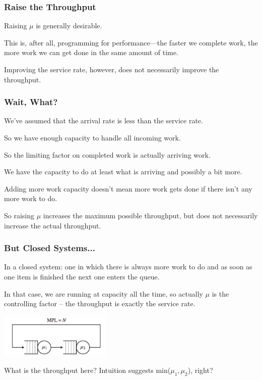 \begin{frame}
\frametitle{Raise the Throughput}

Raising $\mu$ is generally desirable. 

This is, after all, programming for performance---the faster we complete work, the more work we can get done in the same amount of time. 

Improving the service rate, however, does not necessarily improve the throughput. 

\end{frame}



\begin{frame}
\frametitle{Wait, What?}

We've assumed that the arrival rate is less than the service rate. 

So we have enough capacity to handle all incoming work. 

So the limiting factor on completed work is actually arriving work. 

We have the capacity to do at least what is arriving and possibly a bit more. 

Adding more work capacity doesn't mean more work gets done if there isn't any more work to do.

So raising $\mu$ increases the maximum possible throughput, but does not necessarily increase the actual throughput.

\end{frame}



\begin{frame}
\frametitle{But Closed Systems...}


In a closed system: one in which there is always more work to do and as soon as one item is finished the next one enters the queue. 

 In that case, we are running at capacity all the time, so actually $\mu$ is the controlling factor -- the throughput is exactly the service rate. 
 
 \begin{center}
	\includegraphics[width=0.4\textwidth]{images/tandem-closed.png}
\end{center}

What is the throughput here?  Intuition suggests min($\mu_{1}, \mu_{2}$), right? 

\end{frame}




